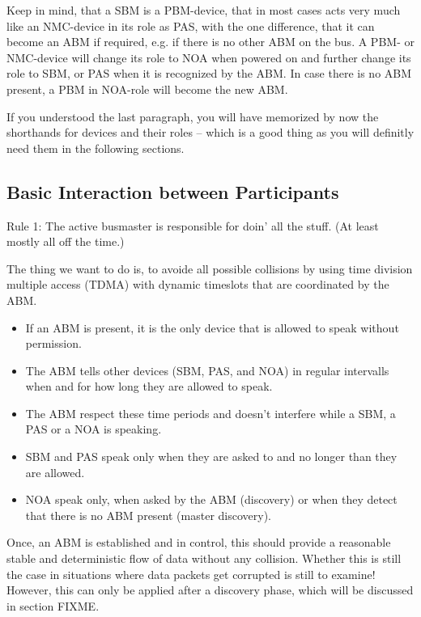 \documentclass[a4paper,12pt]{scrartcl}
\begin{document}
Keep in mind, that a SBM is a PBM-device, that in most cases acts very much like an NMC-device in its role as PAS, with the one difference,
that it can become an ABM if required, e.g. if there is no other ABM on the bus.
A PBM- or NMC-device will change its role to NOA when powered on and further change its role to SBM, or PAS when it is recognized by the ABM.
In case there is no ABM present, a PBM in NOA-role will become the new ABM.

If you understood the last paragraph, you will have memorized by now the shorthands for devices and their roles -- which is a
good thing as you will definitly need them in the following sections.

\subsection{Basic Interaction between Participants}
Rule 1: The active busmaster is responsible for doin' all the stuff. (At least mostly all off the time.)

The thing we want to do is, to avoide all possible collisions by using time division multiple access
(TDMA) with dynamic timeslots that are coordinated by the ABM.

\begin{itemize}
\item If an ABM is present, it is the only device that is allowed to speak without permission.
\item The ABM tells other devices (SBM, PAS, and NOA) in regular intervalls when and for how long they are allowed to speak.
\item The ABM respect these time periods and doesn't interfere while a SBM, a PAS or a NOA is speaking.
\item SBM and PAS speak only when they are asked to and no longer than they are allowed.
\item NOA speak only, when asked by the ABM (discovery) or when they detect that there is no ABM present (master discovery).
\end{itemize}

Once, an ABM is established and in control, this should provide a reasonable stable and deterministic flow of data without any collision.
Whether this is still the case in situations where data packets get corrupted is still to examine!
However, this can only be applied after a discovery phase, which will be discussed in section FIXME.
\end{document}
